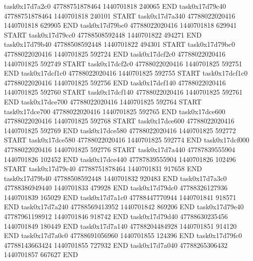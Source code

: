 task0x17d7a2c0 47788751878464          1440701818               240065  END
task0x17d79c40 47788751878464          1440701818               240101  START
task0x17d7a340 47788022020416          1440701818               629905  END
task0x17d79bc0 47788022020416          1440701818               629941  START
task0x17d79cc0 47788508592448          1440701822               494271  END
task0x17d79b40 47788508592448          1440701822               494301  START
task0x17d79bc0 47788022020416          1440701825               592724  END
task0x17dcf2c0 47788022020416          1440701825               592749  START
task0x17dcf2c0 47788022020416          1440701825               592751  END
task0x17dcf1c0 47788022020416          1440701825               592755  START
task0x17dcf1c0 47788022020416          1440701825               592756  END
task0x17dcf140 47788022020416          1440701825               592760  START
task0x17dcf140 47788022020416          1440701825               592761  END
task0x17dce700 47788022020416          1440701825               592764  START
task0x17dce700 47788022020416          1440701825               592765  END
task0x17dce600 47788022020416          1440701825               592768  START
task0x17dce600 47788022020416          1440701825               592769  END
task0x17dce580 47788022020416          1440701825               592772  START
task0x17dce580 47788022020416          1440701825               592774  END
task0x17dcf000 47788022020416          1440701825               592776  START
task0x17d7a440 47787839555904          1440701826               102452  END
task0x17dce440 47787839555904          1440701826               102496  START
task0x17d79c40 47788751878464          1440701831               917658  END
task0x17d79b40 47788508592448          1440701832               920483  END
task0x17d7a3c0 47788386949440          1440701833               479928  END
task0x17d79dc0 47788326127936          1440701839               165029  END
task0x17d7a1c0 47788447770944          1440701841               918571  END
task0x17d7a240 47788569413952          1440701842               869206  END
task0x17d79e40 47787961198912          1440701846               918742  END
task0x17d79d40 47788630235456          1440701849               180449  END
task0x17d7a140 47788204484928          1440701851               914120  END
task0x17d7a0c0 47788691056960          1440701855               124396  END
task0x17d79fc0 47788143663424          1440701855               727932  END
task0x17d7a040 47788265306432          1440701857               667627  END
